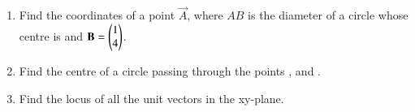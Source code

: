 \renewcommand{\theequation}{\theenumi}
\begin{enumerate}[label=\arabic*.,ref=\thesubsection.\theenumi]
\item Find the coordinates of a point $\vec{A}$, where $AB$ is the diameter of a circle whose centre is  and $\mathbf{B} = \begin{pmatrix}1\\4\end{pmatrix}$.
\item Find the centre of a circle passing through the points ,  and  .
\item Find the locus of all the unit vectors in the xy-plane.
\end{enumerate}
